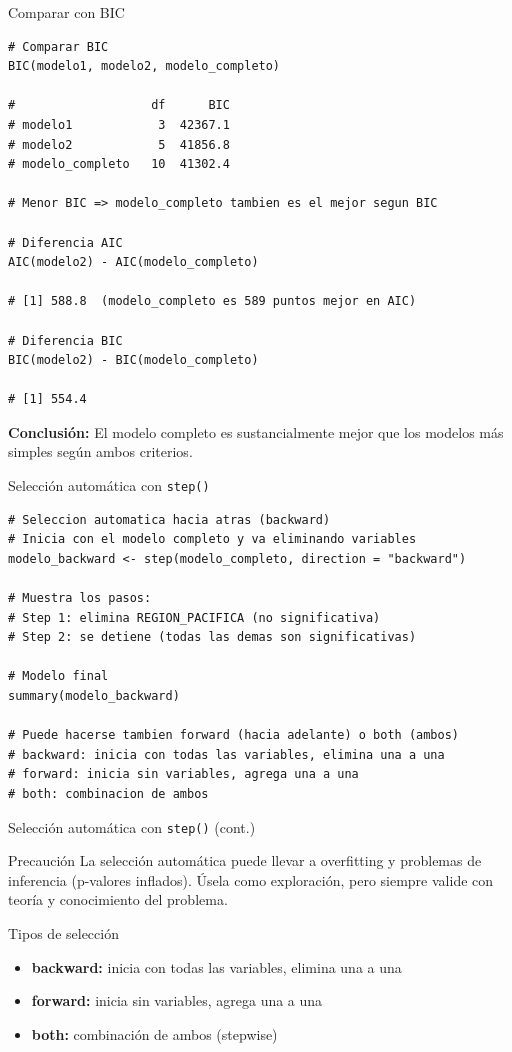 \documentclass[aspectratio=169, 11pt]{beamer}
\begin{document}
\begin{frame}[fragile]{Comparar con BIC}
\begin{lstlisting}[basicstyle=\ttfamily\scriptsize]
# Comparar BIC
BIC(modelo1, modelo2, modelo_completo)

#                   df      BIC
# modelo1            3  42367.1
# modelo2            5  41856.8
# modelo_completo   10  41302.4

# Menor BIC => modelo_completo tambien es el mejor segun BIC

# Diferencia AIC
AIC(modelo2) - AIC(modelo_completo)

# [1] 588.8  (modelo_completo es 589 puntos mejor en AIC)

# Diferencia BIC
BIC(modelo2) - BIC(modelo_completo)

# [1] 554.4
\end{lstlisting}
\vspace{-2pt}
{\footnotesize \textbf{Conclusi\'on:} El modelo completo es sustancialmente mejor que los modelos m\'as simples seg\'un ambos criterios.}
\end{frame}

\begin{frame}[fragile]{Selecci\'on autom\'atica con \texttt{step()}}
\begin{lstlisting}[basicstyle=\ttfamily\scriptsize]
# Seleccion automatica hacia atras (backward)
# Inicia con el modelo completo y va eliminando variables
modelo_backward <- step(modelo_completo, direction = "backward")

# Muestra los pasos:
# Step 1: elimina REGION_PACIFICA (no significativa)
# Step 2: se detiene (todas las demas son significativas)

# Modelo final
summary(modelo_backward)

# Puede hacerse tambien forward (hacia adelante) o both (ambos)
# backward: inicia con todas las variables, elimina una a una
# forward: inicia sin variables, agrega una a una
# both: combinacion de ambos
\end{lstlisting}
\end{frame}

\begin{frame}{Selecci\'on autom\'atica con \texttt{step()} (cont.)}
\begin{alertblock}{Precauci\'on}
La selecci\'on autom\'atica puede llevar a overfitting y problemas de inferencia (p-valores inflados). \'Usela como exploraci\'on, pero siempre valide con teor\'ia y conocimiento del problema.
\end{alertblock}

\vspace{0.3cm}
\begin{block}{Tipos de selecci\'on}
\begin{itemize}
  \item \textbf{backward:} inicia con todas las variables, elimina una a una
  \item \textbf{forward:} inicia sin variables, agrega una a una
  \item \textbf{both:} combinaci\'on de ambos (stepwise)
\end{itemize}
\end{block}
\end{frame}
\end{document}
